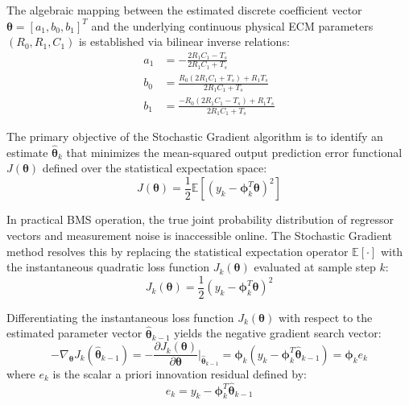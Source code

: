 The algebraic mapping between the estimated discrete coefficient vector $\boldsymbol{\theta} = [a_1, b_0, b_1]^T$ and the underlying continuous physical ECM parameters $(R_0, R_1, C_1)$ is established via bilinear inverse relations:
\begin{align}
a_1 &= -\frac{2 R_1 C_1 - T_s}{2 R_1 C_1 + T_s} \label{eq:sg_map_a1} \\
b_0 &= \frac{R_0 (2 R_1 C_1 + T_s) + R_1 T_s}{2 R_1 C_1 + T_s} \label{eq:sg_map_b0} \\
b_1 &= \frac{-R_0 (2 R_1 C_1 - T_s) + R_1 T_s}{2 R_1 C_1 + T_s} \label{eq:sg_map_b1}
\end{align}

The primary objective of the Stochastic Gradient algorithm is to identify an estimate $\hat{\boldsymbol{\theta}}_k$ that minimizes the mean-squared output prediction error functional $J(\boldsymbol{\theta})$ defined over the statistical expectation space:
\begin{equation}
J(\boldsymbol{\theta}) = \frac{1}{2} \mathbb{E} \left[ \left( y_k - \boldsymbol{\phi}_k^T \boldsymbol{\theta} \right)^2 \right]
\label{eq:sg_cost_functional}
\end{equation}

In practical BMS operation, the true joint probability distribution of regressor vectors and measurement noise is inaccessible online. The Stochastic Gradient method resolves this by replacing the statistical expectation operator $\mathbb{E}[\cdot]$ with the instantaneous quadratic loss function $J_k(\boldsymbol{\theta})$ evaluated at sample step $k$:
\begin{equation}
J_k(\boldsymbol{\theta}) = \frac{1}{2} \left( y_k - \boldsymbol{\phi}_k^T \boldsymbol{\theta} \right)^2
\label{eq:sg_instantaneous_cost}
\end{equation}

Differentiating the instantaneous loss function $J_k(\boldsymbol{\theta})$ with respect to the estimated parameter vector $\hat{\boldsymbol{\theta}}_{k-1}$ yields the negative gradient search vector:
\begin{equation}
-\nabla_{\boldsymbol{\theta}} J_k(\hat{\boldsymbol{\theta}}_{k-1}) = -\frac{\partial J_k(\boldsymbol{\theta})}{\partial \boldsymbol{\theta}} \bigg|_{\hat{\boldsymbol{\theta}}_{k-1}} = \boldsymbol{\phi}_k \left( y_k - \boldsymbol{\phi}_k^T \hat{\boldsymbol{\theta}}_{k-1} \right) = \boldsymbol{\phi}_k e_k
\label{eq:sg_negative_gradient}
\end{equation}
where $e_k$ is the scalar a priori innovation residual defined by:
\begin{equation}
e_k = y_k - \boldsymbol{\phi}_k^T \hat{\boldsymbol{\theta}}_{k-1}
\label{eq:sg_scalar_innovation}
\end{equation}

